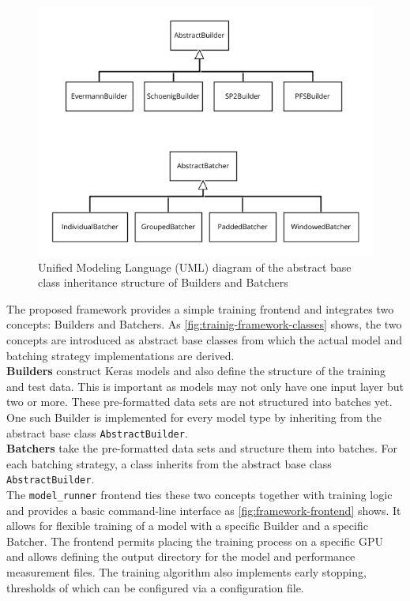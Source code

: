 \begin{figure}
    \centering
    \includegraphics[width=\textwidth]{gfx/training-framework-classes.png}
    \caption[UML diagram of the framework classes]{Unified Modeling Language (UML) diagram of the abstract base class inheritance structure of Builders and Batchers}
    \label{fig:trainig-framework-classes}
\end{figure}

The proposed framework provides a simple training frontend and integrates two concepts: Builders and Batchers. As \autoref{fig:trainig-framework-classes} shows, the two concepts are introduced as abstract base classes from which the actual model and batching strategy implementations are derived.\\

\noindent\textbf{Builders} construct Keras models and also define the structure of the training and test data. This is important as models may not only have one input layer but two or more. These pre-formatted data sets are not structured into batches yet. One such Builder is implemented for every model type by inheriting from the abstract base class \verb=AbstractBuilder=.\\

\noindent\textbf{Batchers} take the pre-formatted data sets and structure them into batches. For each batching strategy, a class inherits from the abstract base class \verb=AbstractBuilder=.\\

\noindent The \verb=model_runner= frontend ties these two concepts together with training logic and provides a basic command-line interface as \autoref{fig:framework-frontend} shows. It allows for flexible training of a model with a specific Builder and a specific Batcher. The frontend permits placing the training process on a specific GPU and allows defining the output directory for the model and performance measurement files. The training algorithm also implements early stopping, thresholds of which can be configured via a configuration file.\\

